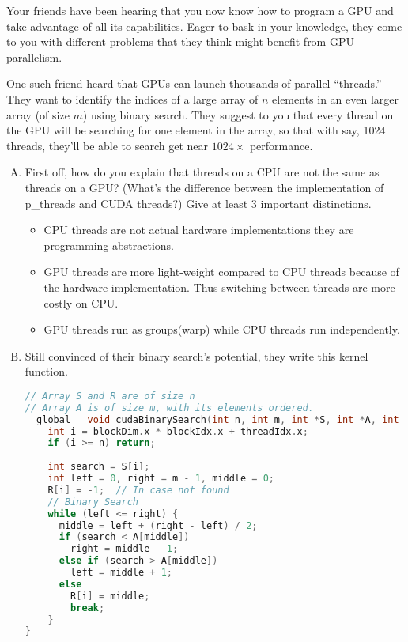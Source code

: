 \documentclass[11pt]{article}
\newenvironment{choice}{\begin{enumerate}[A.]}{\end{enumerate}}
\newenvironment{answer}{\begin{minipage}[c][1.5in]{\textwidth}}{\end{minipage}}
\begin{document}
Your friends have been hearing that you now know how to program a GPU
and take advantage of all its capabilities. Eager to bask in your
knowledge, they come to you with different problems that they think
might benefit from GPU parallelism.

One such friend heard that GPUs can launch thousands of parallel
``threads.'' They want to identify the indices of a large array of
$n$ elements in an even larger array (of size $m$) using binary search. They suggest to
you that every thread on the GPU will be searching for one element in
the array, so that with say, 1024 threads, they'll be able to search
get near $1024\times$ performance.

\begin{choice}
\item
First off, how do you explain that
threads on a CPU are not the same as threads on a GPU? (What's the
difference between the implementation of p\_threads and CUDA threads?)
Give at least 3 important distinctions.


\begin{answer}
\begin{itemize}
\item CPU threads are not actual hardware implementations they are programming abstractions.
\item GPU threads are more light-weight compared to CPU threads because of the hardware implementation. Thus switching between threads are more costly on CPU.
\item GPU threads run as groups(warp) while CPU threads run independently.
\end{itemize} 

\end{answer}

\item
Still convinced of their binary search's potential, they write this kernel function.

\begin{lstlisting}[language=C,basicstyle=\ttfamily]
// Array S and R are of size n
// Array A is of size m, with its elements ordered.
__global__ void cudaBinarySearch(int n, int m, int *S, int *A, int *R) {
    int i = blockDim.x * blockIdx.x + threadIdx.x;
    if (i >= n) return;
    
    int search = S[i];
    int left = 0, right = m - 1, middle = 0;
    R[i] = -1;  // In case not found
    // Binary Search
    while (left <= right) {
      middle = left + (right - left) / 2;      
      if (search < A[middle])
        right = middle - 1;
      else if (search > A[middle])
        left = middle + 1;
      else
        R[i] = middle;
        break;
    }
}
\end{lstlisting}


\end{choice}
\end{document}
